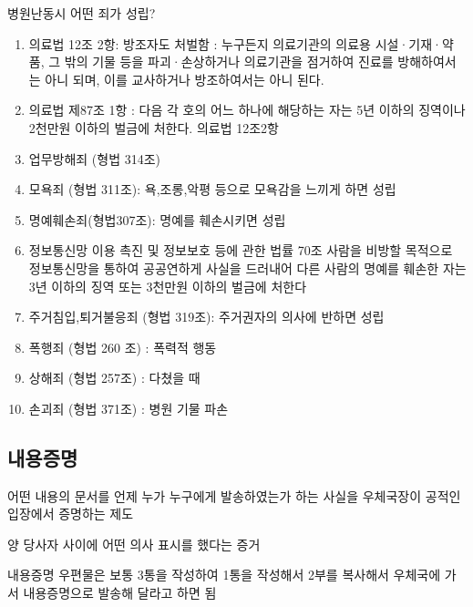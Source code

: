 \begin{hemphsentense}{병원난동시  어떤 죄가 성립?}
\begin{enumerate}[1)]\tightlist
\item 의료법 12조 2항: 방조자도 처벌함 
 : 누구든지 의료기관의 의료용 시설·기재·약품, 그 밖의 기물 등을 파괴·손상하거나 의료기관을 점거하여 진료를 방해하여서는 아니 되며, 이를 교사하거나 방조하여서는 아니 된다.
\item 의료법 제87조 1항 :  다음 각 호의 어느 하나에 해당하는 자는 5년 이하의 징역이나 2천만원 이하의 벌금에 처한다.  의료법 12조2항
\item 업무방해죄 (형법 314조)
\item 모욕죄 (형법 311조):  욕,조롱,악평 등으로 모욕감을 느끼게 하면 성립
\item 명예훼손죄(형법307조):  명예를 훼손시키면 성립
\item 정보통신망 이용 촉진 및 정보보호 등에 관한 법률 70조 
      사람을 비방할 목적으로 정보통신망을 통하여 공공연하게 사실을 드러내어 다른 사람의 명예를 훼손한 자는 3년 이하의 징역 또는 3천만원 이하의 벌금에 처한다
\item 주거침입,퇴거불응죄 (형법 319조):  주거권자의  의사에 반하면 성립 
\item 폭행죄 (형법 260 조) : 폭력적 행동
\item 상해죄 (형법  257조) : 다쳤을 때  
\item 손괴죄 (형법 371조) : 병원 기물 파손
\end{enumerate}
\end{hemphsentense}

\subsection{내용증명}
\begin{description}\tightlist
\item[정의]  어떤  내용의  문서를  언제 누가 누구에게  발송하였는가 하는 사실을  우체국장이  공적인  입장에서  증명하는  제도
\item[의미]  양 당사자 사이에  어떤  의사  표시를  했다는  증거
\item[방법] 내용증명  우편물은  보통 3통을  작성하여  1통을  작성해서  2부를  복사해서  우체국에  가서  내용증명으로  발송해  달라고 하면 됨
\end{description}